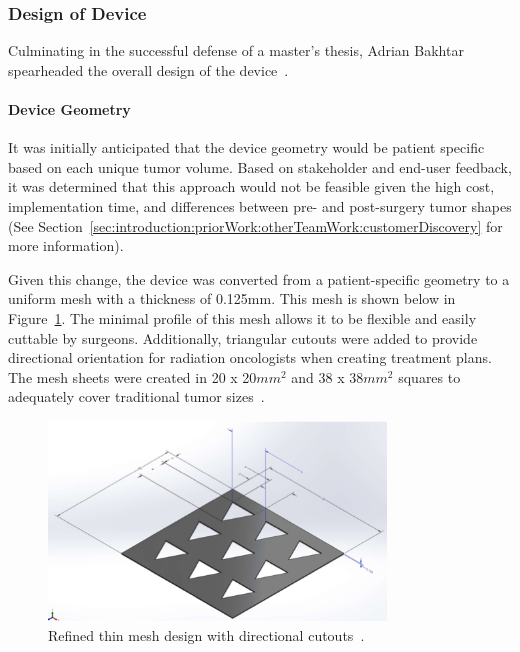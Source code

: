 \subsubsection{Design of Device\label{sec:introduction:priorWork:otherTeamWork:deviceDesign}}

Culminating in the successful defense of a master's thesis, Adrian Bakhtar spearheaded the overall design of the device~\cite{RefWorks:RefID:371-bakhtardesign}.

\paragraph*{Device Geometry\label{introduction:priorWork:otherTeamWork:deviceDesign:deviceGeometry}}

It was initially anticipated that the device geometry would be patient specific based on each unique tumor volume. Based on stakeholder and end-user feedback, it was determined that this approach would not be feasible given the high cost, implementation time, and differences between pre- and post-surgery tumor shapes (See Section~\ref{sec:introduction:priorWork:otherTeamWork:customerDiscovery} for more information).

Given this change, the device was converted from a patient-specific geometry to a uniform mesh with a thickness of 0.125mm. This mesh is shown below in Figure~\ref{fig:introduction:initialThinMeshDesign}. The minimal profile of this mesh allows it to be flexible and easily cuttable by surgeons. Additionally, triangular  cutouts were added to provide directional orientation for radiation oncologists when creating treatment plans. The mesh sheets were created in 20 x 20$mm^2$ and 38 x 38$mm^2$ squares to adequately cover traditional tumor sizes~\cite{RefWorks:RefID:371-bakhtardesign}.

\begin{figure}[h!]
        \centering
        \includegraphics[width=0.8\textwidth]{../figs/introduction/thin_flat_mesh_design_with_cutouts.png}
        \caption{Refined thin mesh design with directional cutouts~\cite{RefWorks:RefID:371-bakhtardesign}.}
        \label{fig:introduction:initialThinMeshDesign}
\end{figure}

